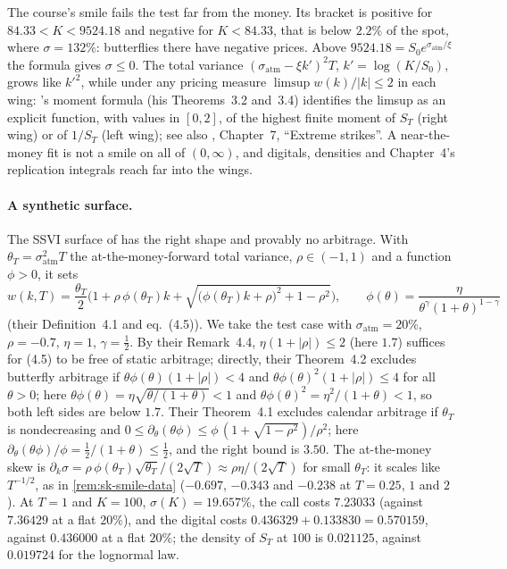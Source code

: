 The course's smile fails the test far from the money. Its bracket is positive for
$84.33<K<9524.18$ and negative for $K<84.33$, that is below $2.2\%$ of the spot, where $\sigma=132\%$:
butterflies there have negative prices. Above $9524.18=S_0e^{\sigma_{\mathrm{atm}}/\xi}$ the formula gives
$\sigma\le0$. The total variance $(\sigma_{\mathrm{atm}}-\xi k')^2T$, $k'=\log(K/S_0)$, grows like $k'^2$, while under any
pricing measure $\limsup w(k)/|k|\le2$ in each wing: \textcite{lee-moment-formula}'s moment formula
(his Theorems~3.2 and~3.4) identifies the limsup as an explicit function, with values in $[0,2]$, of the
highest finite moment of $S_T$ (right wing) or of $1/S_T$ (left wing); see also
\textcite{gatheral-volatility-surface}, Chapter~7, ``Extreme strikes''. A near-the-money fit is not a smile on all of $(0,\infty)$, and digitals, densities and
Chapter~4's replication integrals reach far into the wings.

\paragraph{A synthetic surface.} The SSVI surface of \textcite{gatheral-jacquier-2014} has the right
shape and provably no arbitrage. With $\theta_T=\sigma_{\mathrm{atm}}^2T$ the at-the-money-forward total
variance, $\rho\in(-1,1)$ and a function $\phi>0$, it sets
\begin{equation}\label{eq:sk-ssvi}
  w(k,T)=\frac{\theta_T}2\Big(1+\rho\,\phi(\theta_T)k+\sqrt{\big(\phi(\theta_T)k+\rho\big)^2+1-\rho^2}\Big),\qquad
  \phi(\theta)=\frac{\eta}{\theta^\gamma(1+\theta)^{1-\gamma}}
\end{equation}
(their Definition~4.1 and eq.~(4.5)). We take the test case with $\sigma_{\mathrm{atm}}=20\%$, $\rho=-0.7$,
$\eta=1$, $\gamma=\frac12$. By their Remark~4.4, $\eta(1+|\rho|)\le2$ (here $1.7$) suffices for (4.5) to be free of
static arbitrage; directly, their Theorem~4.2 excludes butterfly arbitrage if
$\theta\phi(\theta)(1+|\rho|)<4$ and $\theta\phi(\theta)^2(1+|\rho|)\le4$ for all $\theta>0$; here
$\theta\phi(\theta)=\eta\sqrt{\theta/(1+\theta)}<1$ and $\theta\phi(\theta)^2=\eta^2/(1+\theta)<1$, so both left
sides are below $1.7$. Their Theorem~4.1 excludes calendar arbitrage if $\theta_T$ is nondecreasing and
$0\le\partial_\theta(\theta\phi)\le\phi\,(1+\sqrt{1-\rho^2})/\rho^2$; here $\partial_\theta(\theta\phi)/\phi=\frac12/(1+\theta)\le\frac12$,
and the right bound is $3.50$. The at-the-money skew is
$\partial_k\sigma=\rho\,\phi(\theta_T)\sqrt{\theta_T}/(2\sqrt T)\approx\rho\eta/(2\sqrt T)$ for small $\theta_T$: it scales
like $T^{-1/2}$, as in \cref{rem:sk-smile-data} ($-0.697$, $-0.343$ and $-0.238$ at $T=0.25$, $1$ and $2$).
At $T=1$ and $K=100$, $\sigma(K)=19.657\%$, the call costs $7.23033$ (against $7.36429$ at a flat $20\%$),
and the digital costs $0.436329+0.133830=0.570159$, against $0.436000$ at a flat $20\%$; the density of
$S_T$ at $100$ is $0.021125$, against $0.019724$ for the lognormal law.

